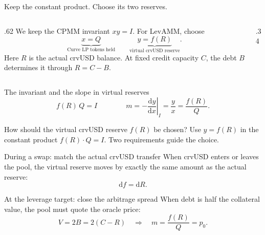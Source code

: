 \documentclass[aspectratio=169,11pt]{beamer}
\begin{document}
\begin{frame}{Keep the constant product. Choose its two reserves.}
  \begin{columns}[c,onlytextwidth]
    \begin{column}{.62\textwidth}
      We keep the CPMM invariant $xy=I$. For LevAMM, choose
      \begin{equation}\label{eq:reserve-choice}
        \underbrace{x=Q}_{\text{Curve LP tokens held}}
        \qquad
        \underbrace{y=f(R)}_{\text{virtual crvUSD reserve}}.
      \end{equation}
      Here $R$ is the actual crvUSD balance. At fixed credit capacity $C$,
      the debt $B$ determines it through $R=C-B$.
    \end{column}
    \begin{column}{.34\textwidth}
    \end{column}
  \end{columns}

  \medskip
  \begin{block}{The invariant and the slope in virtual reserves}
    \begin{equation}\label{eq:virtual-cpmm}
      f(R)\,Q=I
      \qquad\qquad
      m=-\left.\frac{\mathrm dy}{\mathrm dx}\right|_I
      =\frac{y}{x}=\frac{f(R)}{Q}.
    \end{equation}
  \end{block}
\end{frame}

\begin{frame}{How should the virtual crvUSD reserve $f(R)$ be chosen?}
  Use $y=f(R)$ in the constant product $f(R) \cdot Q=I$. Two requirements guide the choice.

  \begin{block}{During a swap: match the actual crvUSD transfer}
    When crvUSD enters or leaves the pool, the virtual reserve moves
    by exactly the same amount as the actual reserve:
    \begin{equation}\label{eq:shift-condition}
      \boxed{\mathrm df=\mathrm dR}.
    \end{equation}
  \end{block}

  \begin{block}{At the leverage target: close the arbitrage spread}
    When debt is half the collateral value, the pool must quote the oracle price:
    \begin{equation}\label{eq:parity-condition}
      \boxed{V=2B=2(C-R) \quad\Longrightarrow\quad m=\frac{f(R)}{Q}=p_0}.
    \end{equation}
  \end{block}
\end{frame}
\end{document}
